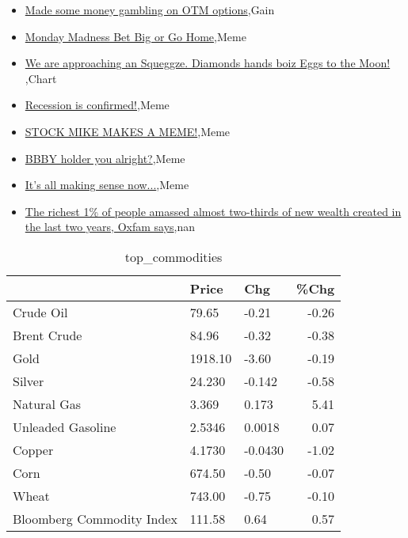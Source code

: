 \documentclass{article}%
\begin{document}
%
\begin{itemize}%
\item%
\href{https://reddit.com/r/wallstreetbets/comments/10dd76s/made\_some\_money\_gambling\_on\_otm\_options/}{Made some money gambling on OTM options},Gain%
\item%
\href{https://reddit.com/r/wallstreetbets/comments/10d9h8q/monday\_madness\_bet\_big\_or\_go\_home/}{Monday Madness Bet Big or Go Home},Meme%
\item%
\href{https://reddit.com/r/wallstreetbets/comments/10d7s3r/we\_are\_approaching\_an\_squeggze\_diamonds\_hands/}{We are approaching an Squeggze. Diamonds hands boiz   Eggs to the Moon! },Chart%
\item%
\href{https://reddit.com/r/wallstreetbets/comments/10d6oyl/recession\_is\_confirmed/}{Recession is confirmed!},Meme%
\item%
\href{https://reddit.com/r/wallstreetbets/comments/10d5oca/stock\_mike\_makes\_a\_meme/}{STOCK MIKE MAKES A MEME!},Meme%
\item%
\href{https://reddit.com/r/wallstreetbets/comments/10d53y5/bbby\_holder\_you\_alright/}{BBBY holder you alright?},Meme%
\item%
\href{https://reddit.com/r/wallstreetbets/comments/10d53rz/its\_all\_making\_sense\_now/}{It's all making sense now...},Meme%
\item%
\href{https://reddit.com/r/Economics/comments/10dc26s/the\_richest\_1\_of\_people\_amassed\_almost\_twothirds/}{The richest 1\% of people amassed almost two-thirds of new wealth created in the last two years, Oxfam says},nan%
\end{itemize}%


\begin{table}[htbp]%
\caption{top\_commodities}%
\centering%
\begin{adjustbox}{width=1\textwidth}%
\begin{tabular}{lllr}
\toprule
                          &   Price &     Chg &  \%Chg \\
\midrule
               Crude Oil  &   79.65 &   -0.21 & -0.26 \\
             Brent Crude  &   84.96 &   -0.32 & -0.38 \\
                    Gold  & 1918.10 &   -3.60 & -0.19 \\
                  Silver  &  24.230 &  -0.142 & -0.58 \\
             Natural Gas  &   3.369 &   0.173 &  5.41 \\
       Unleaded Gasoline  &  2.5346 &  0.0018 &  0.07 \\
                  Copper  &  4.1730 & -0.0430 & -1.02 \\
                    Corn  &  674.50 &   -0.50 & -0.07 \\
                   Wheat  &  743.00 &   -0.75 & -0.10 \\
Bloomberg Commodity Index &  111.58 &    0.64 &  0.57 \\
\bottomrule
\end{tabular}
%
\end{adjustbox}%
\end{table}
\end{document}
